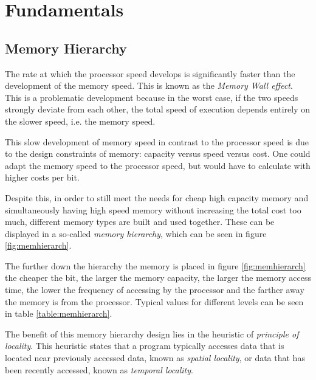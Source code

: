 \chapter{Fundamentals}\label{chapt:basics}

\vspace{-1.5cm}

\section{Memory Hierarchy}\label{subchap:memhierarch}

The rate at which the processor speed develops is significantly faster than the development of the memory speed. This is known as the \textit{Memory Wall effect}. \cite{lwn_caches} \cite{memwall} This is a problematic development because in the worst case, if the two speeds strongly deviate from each other, the total speed of execution depends entirely on the slower speed, i.e. the memory speed. 

This slow development of memory speed in contrast to the processor speed is due to the design constraints of memory: capacity versus speed versus cost. One could adapt the memory speed to the processor speed, but would have to calculate with higher costs per bit. \cite[p. 124]{computerarch}

Despite this, in order to still meet the needs for cheap high capacity memory and simultaneously having high speed memory without increasing the total cost too much, different memory types are built and used together. These can be displayed in a so-called \textit{memory hierarchy}, which can be seen in figure \ref{fig:memhierarch}. \cite[p. 124-125]{computerarch}

The further down the hierarchy the memory is placed in figure \ref{fig:memhierarch} the cheaper the bit, the larger the memory capacity, the larger the memory access time, the lower the frequency of accessing by the processor and the farther away the memory is from the processor. \cite[p. 78]{quantivapproach}  \cite[p. 124-125]{computerarch}  Typical values for different levels can be seen in table \ref{table:memhierarch}. 

The benefit of this memory hierarchy design lies in the heuristic of \textit{principle of locality}. This heuristic states that a program typically accesses data that is located near previously accessed data, known as \textit{spatial locality}, or data that has been recently accessed, known as \textit{temporal locality}. \cite[p. 234]{threeeasy} \cite[p. 158-160]{computerarch}

